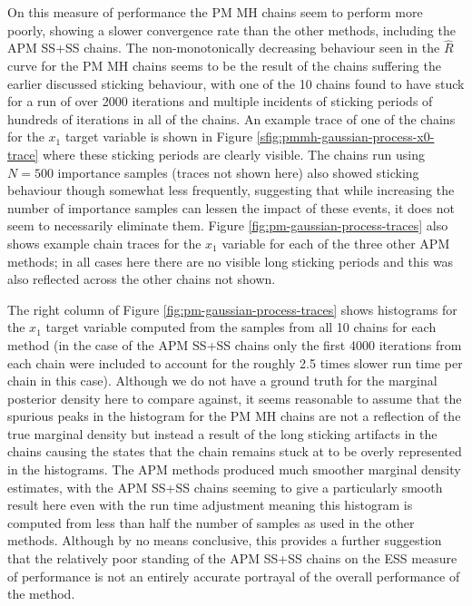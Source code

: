 On this measure of performance the \ac{PM} \ac{MH} chains seem to perform more poorly, showing a slower convergence rate than the other methods, including the \ac{APM} \ac{SS}+\ac{SS} chains. The non-monotonically decreasing behaviour seen in the $\hat{R}$ curve for the \ac{PM} \ac{MH} chains seems to be the result of the chains suffering the earlier discussed sticking behaviour, with one of the 10 chains found to have stuck for a run of over 2000 iterations and multiple incidents of sticking periods of hundreds of iterations in all of the chains. An example trace of one of the chains for the $x_1$ target variable is shown in Figure \ref{sfig:pmmh-gaussian-process-x0-trace} where these sticking periods are clearly visible. The chains run using $N=500$ importance samples (traces not shown here) also showed sticking behaviour though somewhat less frequently, suggesting that while increasing the number of importance samples can lessen the impact of these events, it does not seem to necessarily eliminate them. Figure \ref{fig:pm-gaussian-process-traces} also shows example chain traces for the $x_1$ variable for each of the three other \ac{APM} methods; in all cases here there are no visible long sticking periods and this was also reflected across the other chains not shown. 

The right column of Figure \ref{fig:pm-gaussian-process-traces} shows histograms for the $x_1$ target variable computed from the samples from all 10 chains for each method (in the case of the \ac{APM} \ac{SS}+\ac{SS} chains only the first 4000 iterations from each chain were included to account for the roughly 2.5 times slower run time per chain in this case). Although we do not have a ground truth for the marginal posterior density here to compare against, it seems reasonable to assume that the spurious peaks in the histogram for the \ac{PM} \ac{MH} chains are not a reflection of the true marginal density but instead a result of the long sticking artifacts in the chains causing the states that the chain remains stuck at to be overly represented in the histograms. The \ac{APM} methods produced much smoother marginal density estimates, with the \ac{APM} \ac{SS}+\ac{SS} chains seeming to give a particularly smooth result here even with the run time adjustment meaning this histogram is computed from less than half the number of samples as used in the other methods. Although by no means conclusive, this provides a further suggestion that the relatively poor standing of the \ac{APM} \ac{SS}+\ac{SS} chains on the \ac{ESS} measure of performance is not an entirely accurate portrayal of the overall performance of the method. 

